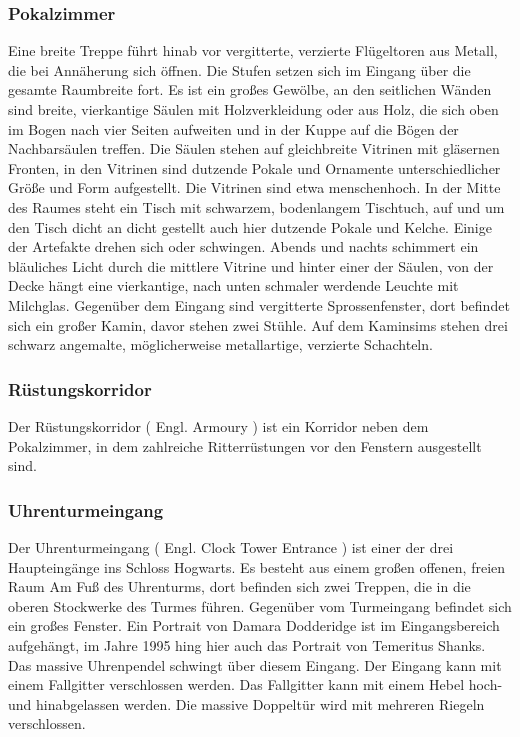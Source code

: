 \documentclass[a4paper, 10pt]{article}
\begin{document}
\subsubsection*{\large Pokalzimmer}
Eine breite Treppe führt hinab vor vergitterte, verzierte Flügeltoren aus Metall, die bei Annäherung sich öffnen. Die Stufen setzen sich im Eingang über die gesamte Raumbreite fort. Es ist ein großes Gewölbe, an den seitlichen Wänden sind breite, vierkantige Säulen mit Holzverkleidung oder aus Holz, die sich oben im Bogen nach vier Seiten aufweiten und in der Kuppe auf die Bögen der Nachbarsäulen treffen. Die Säulen stehen auf gleichbreite Vitrinen mit gläsernen Fronten, in den Vitrinen sind dutzende Pokale und Ornamente unterschiedlicher Größe und Form aufgestellt. Die Vitrinen sind etwa menschenhoch.
\vspace{10pt}
\newline
In der Mitte des Raumes steht ein Tisch mit schwarzem, bodenlangem Tischtuch, auf und um den Tisch dicht an dicht gestellt auch hier dutzende Pokale und Kelche. Einige der Artefakte drehen sich oder schwingen. Abends und nachts schimmert ein bläuliches Licht durch die mittlere Vitrine und hinter einer der Säulen, von der Decke hängt eine vierkantige, nach unten schmaler werdende Leuchte mit Milchglas. Gegenüber dem Eingang sind vergitterte Sprossenfenster, dort befindet sich ein großer Kamin, davor stehen zwei Stühle. Auf dem Kaminsims stehen drei schwarz angemalte, möglicherweise metallartige, verzierte Schachteln.
\subsubsection*{\large Rüstungskorridor}
Der Rüstungskorridor (  Engl.  Armoury ) ist ein Korridor neben dem Pokalzimmer, in dem zahlreiche Ritterrüstungen vor den Fenstern ausgestellt sind.
\subsubsection*{\large Uhrenturmeingang}
Der Uhrenturmeingang (  Engl.  Clock Tower Entrance ) ist einer der drei Haupteingänge ins Schloss Hogwarts. Es besteht aus einem großen offenen, freien Raum Am Fuß des Uhrenturms, dort befinden sich zwei Treppen, die in die oberen Stockwerke des Turmes führen. Gegenüber vom Turmeingang befindet sich ein großes Fenster. Ein Portrait von Damara Dodderidge ist im Eingangsbereich aufgehängt, im Jahre 1995 hing hier auch das Portrait von Temeritus Shanks.
\vspace{10pt}
\newline
Das massive Uhrenpendel schwingt über diesem Eingang. Der Eingang kann mit einem Fallgitter verschlossen werden. Das Fallgitter kann mit einem Hebel hoch- und hinabgelassen werden. Die massive Doppeltür wird mit mehreren Riegeln verschlossen.
\end{document}
